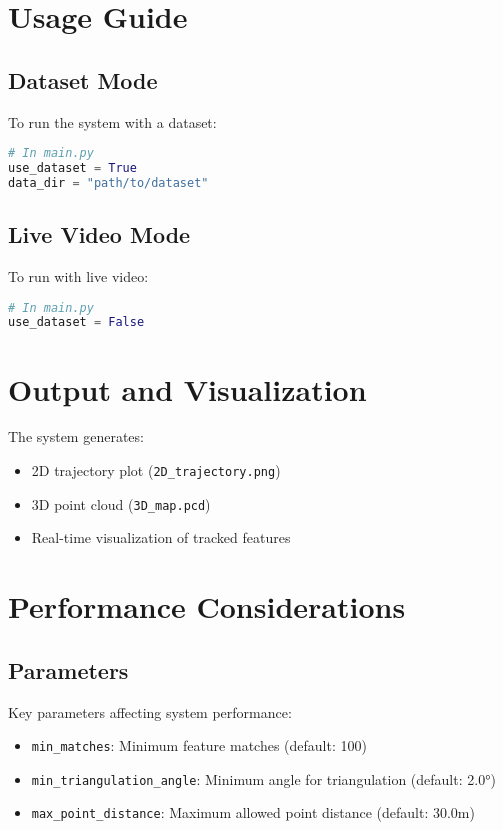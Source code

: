 \documentclass[11pt,a4paper]{article}
\begin{document}
\section{Usage Guide}
\subsection{Dataset Mode}
To run the system with a dataset:
\begin{lstlisting}[language=python]
# In main.py
use_dataset = True
data_dir = "path/to/dataset"
\end{lstlisting}

\subsection{Live Video Mode}
To run with live video:
\begin{lstlisting}[language=python]
# In main.py
use_dataset = False
\end{lstlisting}

\section{Output and Visualization}
The system generates:
\begin{itemize}
    \item 2D trajectory plot (\texttt{2D\_trajectory.png})
    \item 3D point cloud (\texttt{3D\_map.pcd})
    \item Real-time visualization of tracked features
\end{itemize}

\section{Performance Considerations}
\subsection{Parameters}
Key parameters affecting system performance:
\begin{itemize}
    \item \texttt{min\_matches}: Minimum feature matches (default: 100)
    \item \texttt{min\_triangulation\_angle}: Minimum angle for triangulation (default: 2.0°)
    \item \texttt{max\_point\_distance}: Maximum allowed point distance (default: 30.0m)
\end{itemize}
\end{document}
